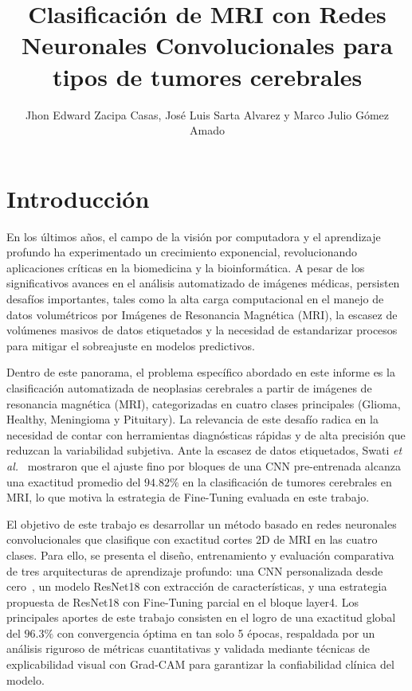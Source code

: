 \documentclass[letterpaper, 10 pt, conference]{ieeeconf}  %
\title{\LARGE \bf
Clasificación de MRI con Redes Neuronales Convolucionales para tipos de tumores cerebrales  
}
\author{Jhon Edward Zacipa Casas, José Luis Sarta Alvarez  y Marco Julio Gómez Amado }
\begin{document}
\maketitle
\thispagestyle{empty}
\pagestyle{empty}



\section{Introducción}

En los últimos años, el campo de la visión por computadora y el aprendizaje profundo ha experimentado un crecimiento exponencial, revolucionando aplicaciones críticas en la biomedicina y la bioinformática. A pesar de los significativos avances en el análisis automatizado de imágenes médicas, persisten desafíos importantes, tales como la alta carga computacional en el manejo de datos volumétricos por Imágenes de Resonancia Magnética (MRI), la escasez de volúmenes masivos de datos etiquetados y la necesidad de estandarizar procesos para mitigar el sobreajuste en modelos predictivos.

Dentro de este panorama, el problema específico abordado en este informe es la clasificación automatizada de neoplasias cerebrales a partir de imágenes de resonancia magnética (MRI), categorizadas en cuatro clases principales (Glioma, Healthy, Meningioma y Pituitary). La relevancia de este desafío radica en la necesidad de contar con herramientas diagnósticas rápidas y de alta precisión que reduzcan la variabilidad subjetiva. Ante la escasez de datos etiquetados, Swati \textit{et al.}~\cite{swati2019} mostraron que el ajuste fino por bloques de una CNN pre-entrenada alcanza una exactitud promedio del $94.82\%$ en la clasificación de tumores cerebrales en MRI, lo que motiva la estrategia de Fine-Tuning evaluada en este trabajo. 

El objetivo de este trabajo es desarrollar un método basado en redes neuronales convolucionales que clasifique con exactitud cortes 2D de MRI en las cuatro clases. Para ello, se presenta el diseño, entrenamiento y evaluación comparativa de tres arquitecturas de aprendizaje profundo: una CNN personalizada desde cero~\cite{c1}, un modelo ResNet18 con extracción de características, y una estrategia propuesta de ResNet18 con Fine-Tuning parcial en el bloque layer4. Los principales aportes de este trabajo consisten en el logro de una exactitud global del $96.3\%$ con convergencia óptima en tan solo 5 épocas, respaldada por un análisis riguroso de métricas cuantitativas y validada mediante técnicas de explicabilidad visual con Grad-CAM para garantizar la confiabilidad clínica del modelo.
\end{document}
